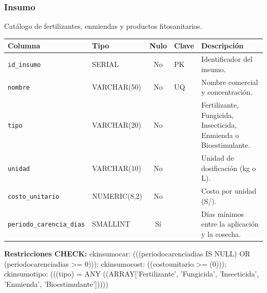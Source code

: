 \documentclass[11pt,letterpaper]{article}
\newcommand{\tbus}{\textunderscore\allowbreak}
\newcommand{\tb}[1]{{\ttfamily\let\_\tbus #1}}
\begin{document}
\subsubsection*{Insumo}
Catálogo de fertilizantes, enmiendas y productos fitosanitarios.
{\footnotesize
\begin{longtable}{>{\raggedright\arraybackslash}p{3.3cm}>{\raggedright\arraybackslash}p{2.5cm}c>{\raggedright\arraybackslash}p{2.2cm}>{\raggedright\arraybackslash}p{6.1cm}}
\toprule
\textbf{Columna} & \textbf{Tipo} & \textbf{Nulo} & \textbf{Clave} & \textbf{Descripción} \\
\midrule
\endhead
\texttt{id\_insumo} & SERIAL & No & PK & Identificador del insumo. \\
\texttt{nombre} & VARCHAR(50) & No & UQ & Nombre comercial y concentración. \\
\texttt{tipo} & VARCHAR(20) & No &  & Fertilizante, Fungicida, Insecticida, Enmienda o Bioestimulante. \\
\texttt{unidad} & VARCHAR(10) & No &  & Unidad de dosificación (kg o L). \\
\texttt{costo\_unitario} & NUMERIC(8,2) & No &  & Costo por unidad (S/). \\
\texttt{periodo\_carencia\_dias} & SMALLINT & Sí &  & Días mínimos entre la aplicación y la cosecha. \\
\bottomrule
\end{longtable}}
{\footnotesize\raggedright\textbf{Restricciones CHECK:} \tb{ck\_insumo\_car}: \tb{(((periodo\_carencia\_dias IS NULL) OR (periodo\_carencia\_dias >= 0)))}; \tb{ck\_insumo\_cost}: \tb{((costo\_unitario >= (0)))}; \tb{ck\_insumo\_tipo}: \tb{(((tipo) = ANY ((ARRAY['Fertilizante', 'Fungicida', 'Insecticida', 'Enmienda', 'Bioestimulante']))))}\par}
\medskip
\end{document}
